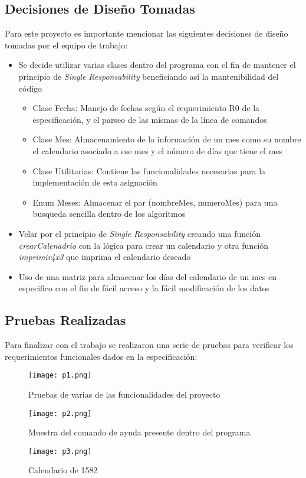 \documentclass[10pt,journal,compsoc]{IEEEtran}
\begin{document}
\subsection{Decisiones de Diseño Tomadas}
	\par Para este proyecto es importante mencionar las siguientes decisiones de diseño tomadas por el equipo de trabajo:
	\begin{itemize}
		\item Se decide utilizar varias clases dentro del programa con el fin de mantener el principio de \textit{Single Responsability} beneficiando así la mantenibilidad del código
		\begin{itemize}
			\item Clase Fecha: Manejo de fechas según el requerimiento R0 de la especificación, y el parseo de las mismas de la línea de comandos
			\item Clase Mes: Almacenamiento de la información de un mes como su nombre el calendario asociado a ese mes y el número de días que tiene el mes
			\item Clase Utilitarias: Contiene las funcionalidades necesarias para la implementación de esta asignación
			\item Enum Meses: Almacenar el par (nombreMes, numeroMes) para una busqueda sencilla dentro de los algoritmos
		\end{itemize}
		\item Velar por el principio de \textit{Single Responsability} creando una función \textit{crearCalenadrio} con la lógica para crear un calendario y otra función \textit{imprimir\textunderscore4x3} que imprima el calendario deseado
		\item Uso de una matriz para almacenar los días del calendario de un mes en especifico con el fin de fácil acceso y la fácil modificación de los datos 
	\end{itemize}
\subsection{Pruebas Realizadas}
	\par Para finalizar con el trabajo se realizaron una serie de pruebas para verificar los requerimientos funcionales dados en la especificación:
	\begin{figure}[h!]
		\centering
		\texttt{[image: p1.png]}
		\caption{Pruebas de varias de las funcionalidades del proyecto}
	\end{figure}
	\begin{figure}[h!]
		\centering
		\texttt{[image: p2.png]}
		\caption{Muestra del comando de ayuda presente dentro del programa}
	\end{figure}
	\begin{figure}[h!]
		\centering
		\texttt{[image: p3.png]}
		\caption{Calendario de 1582}
	\end{figure}
\end{document}
